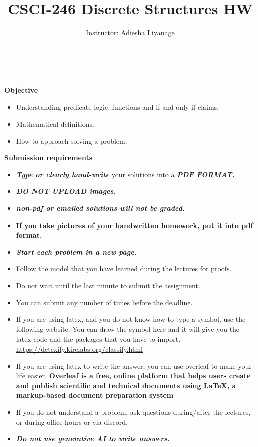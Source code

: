 \documentclass[12pt]{exam}
\title{CSCI-246 Discrete Structures HW \assignmentnumber}
\author{Instructor: Adiesha Liyanage}
\begin{document}
\maketitle

\hrulefill
\\
\\
\textbf{Objective}
\begin{itemize}
    \item Understanding predicate logic, functions and if and only if claims.
    \item Mathematical definitions.
    \item How to approach solving a problem.
\end{itemize}

\textbf{Submission requirements}
\begin{itemize}
    \item \textbf{\textit{Type or clearly hand-write}} your solutions into a \textbf{\textit{PDF FORMAT.}} 
    \item \textbf{\textit{DO NOT UPLOAD images.}}
    \item \textbf{\textit{non-pdf or emailed solutions will not be graded.}}
    \item \textbf{If you take pictures of your handwritten homework, put it into pdf format.}
    \item \textbf{\textit{Start each problem in a new page.}}
    \item Follow the model that you have learned during the lectures for proofs.
    \item Do not wait until the last minute to submit the assignment.
    \item You can submit any number of times before the deadline. 
    \item If you are using latex, and you do not know how to type a symbol, use the following website. You can draw the symbol here and it will give you the latex code and the packages that you have to import. \url{https://detexify.kirelabs.org/classify.html}
    \item If you are using latex to write the answer, you can use overleaf to make your life easier. \textbf{Overleaf is a free, online platform that helps users create and publish scientific and technical documents using LaTeX, a markup-based document preparation system}
    \item If you do not understand a problem, ask questions during/after the lectures, or during office hours or via discord.
    \item \textbf{\textit{Do not use generative AI to write answers.}} 
\end{itemize}
\end{document}
